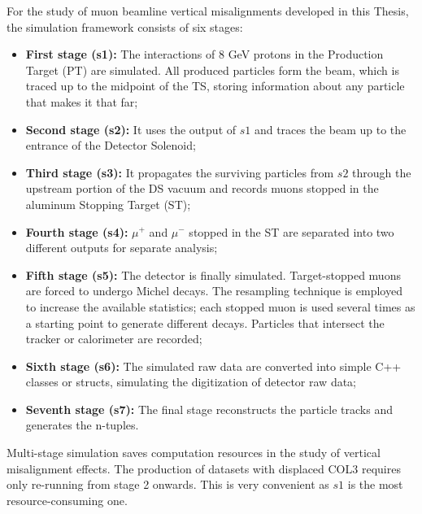 For the study of muon beamline vertical misalignments developed in this Thesis, the simulation 
framework consists of six stages:

\begin{itemize}
    \item \textbf{First stage (s1):} The interactions of 8 GeV protons in the Production Target (PT) 
    are simulated. All produced particles form the beam, which is traced up to the midpoint of the TS, 
    storing information about any particle that makes it that far;
    \item \textbf{Second stage (s2):} It uses the output of $s1$ and traces the beam up to the entrance 
    of the Detector Solenoid;
    \item \textbf{Third stage (s3):} It propagates the surviving particles from $s2$ through the 
    upstream portion of the DS vacuum and records muons stopped in the aluminum 
    Stopping Target (ST);
    \item \textbf{Fourth stage (s4):} $\mu^+$ and $\mu^-$ stopped in the ST are separated into two 
    different outputs for separate analysis;
    \item \textbf{Fifth stage (s5):} The detector is finally simulated. Target-stopped muons are 
    forced to undergo Michel decays. The resampling technique is employed to increase the available 
    statistics; each stopped muon is used several times as a starting point to generate different 
    decays. Particles that intersect the tracker or calorimeter are recorded;
    \item \textbf{Sixth stage (s6):} The simulated raw data are converted into simple C++ classes 
    or structs, simulating the digitization of detector raw data;
    \item \textbf{Seventh stage (s7):} The final stage reconstructs the particle tracks and 
    generates the n-tuples.
\end{itemize}

Multi-stage simulation saves computation resources in the study of vertical misalignment 
effects. The production of datasets with displaced COL3 requires only re-running from stage 
2 onwards. This is very convenient as $s1$ is the most resource-consuming one.
